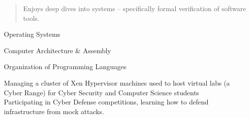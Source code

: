   \begin{quote}
    Enjoys deep dives into systems -- specifically formal verification of software tools.
  \end{quote}


  \smallskip{}

  \smallskip{}
  
  Operating Systems \par
  Computer Architecture \& Assembly \par
  Organization of Programming Languages
  

  Managing a cluster of Xen Hypervisor machines used to host virtual labs (a Cyber Range) for Cyber Security and Computer Science students
  \\
  Participating in Cyber Defense competitions, learning how to defend infrastructure from mock attacks.

